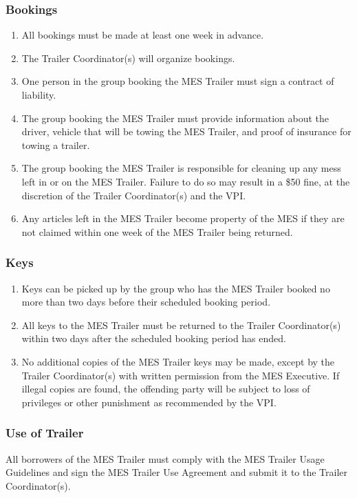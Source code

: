 \subsubsection{Bookings}
\label{bookings}

\begin{enumerate}
 \item
  All bookings must be made at least one week in advance.
 \item
  The Trailer Coordinator(s) will organize bookings.
 \item
  One person in the group booking the MES Trailer must sign a contract of liability.
 \item
  The group booking the MES Trailer must provide information about the driver, vehicle that will be towing the MES Trailer, and proof of insurance for towing a trailer.
 \item
  The group booking the MES Trailer is responsible for cleaning up any mess left in or on the MES Trailer. Failure to do so may result in a \$50 fine, at the discretion of the Trailer Coordinator(s) and the VPI.
 \item
  Any articles left in the MES Trailer become property of the MES if they are not claimed within one week of the MES Trailer being returned.

\end{enumerate}

\subsubsection{Keys}
\label{keys}
\begin{enumerate}
 \item
  Keys can be picked up by the group who has the MES Trailer booked no more than two days before their scheduled booking period.
 \item
  All keys to the MES Trailer must be returned to the Trailer Coordinator(s) within two days after the scheduled booking period has ended.
 \item
  No additional copies of the MES Trailer keys may be made, except by the Trailer Coordinator(s) with written permission from the MES Executive. If illegal copies are found, the offending party will be subject to loss of privileges or other punishment as recommended by the VPI.
\end{enumerate}

\subsubsection{Use of Trailer}
\label{use-of-trailer}
All borrowers of the MES Trailer must comply with the MES Trailer Usage
Guidelines and sign the MES Trailer Use Agreement and submit it to the
Trailer Coordinator(s).  %


